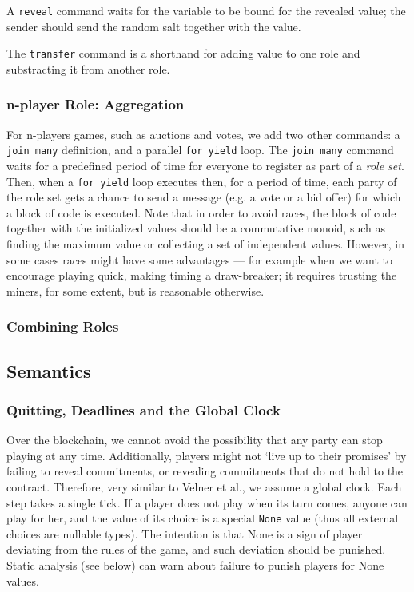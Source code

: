 \documentclass[acmsmall,review,anonymous]{acmart}\settopmatter{printfolios=true,printccs=false,printacmref=false}
\begin{document}
A \texttt{reveal} command waits for the variable to be bound for the revealed value; the sender should send the random salt together with the value.

The \texttt{transfer} command is a shorthand for adding value to one role and substracting it from another role.

\subsubsection{n-player Role: Aggregation}

For n-players games, such as auctions and votes, we add two other commands: a \texttt{join many} definition, and a parallel \texttt{for yield} loop. The \texttt{join many} command waits for a predefined period of time for everyone to register as part of a \textit{role set}. Then, when a \texttt{for yield} loop executes then, for a period of time, each party of the role set gets a chance to send a message (e.g. a vote or a bid offer) for which a block of code is executed. Note that in order to avoid races, the block of code together with the initialized values should be a commutative monoid, such as finding the maximum value or collecting a set of independent values. However, in some cases races might have some advantages --- for example when we want to encourage playing quick, making timing a draw-breaker; it requires trusting the miners, for some extent, but is reasonable otherwise.


\subsubsection{Combining Roles}

\subsection{Semantics}

\subsubsection{Quitting, Deadlines and the Global Clock}
Over the blockchain, we cannot avoid the possibility that any party can stop playing at any time. Additionally, players might not `live up to their promises' by failing to reveal commitments, or revealing commitments that do not hold to the contract.
Therefore, very similar to Velner et al., we assume a global clock. Each step takes a single tick. If a player does not play when its turn comes, anyone can play for her, and the value of its choice is a special \texttt{None} value (thus all external choices are nullable types). The intention is that None is a sign of player deviating from the rules of the game, and such deviation should be punished. Static analysis (see below) can warn about failure to punish players for None values.
\end{document}
